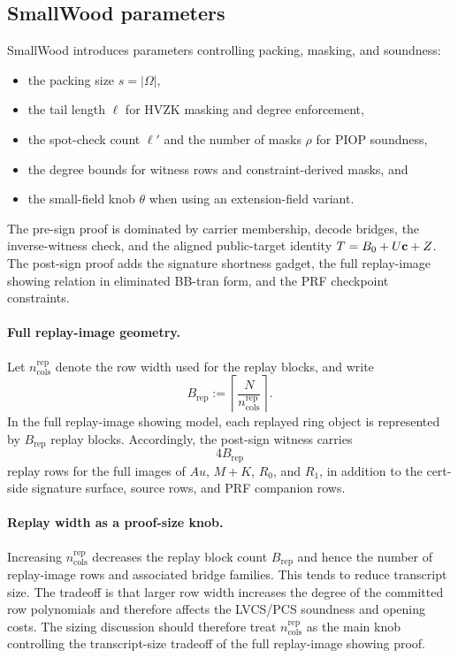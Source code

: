 \subsection{SmallWood parameters}
SmallWood introduces parameters controlling packing, masking, and soundness:
\begin{itemize}[leftmargin=1.25em]
  \item the packing size \(s=|\Omega|\),
  \item the tail length \(\ell\) for HVZK masking and degree enforcement,
  \item the spot-check count \(\ell'\) and the number of masks \(\rho\) for PIOP soundness,
  \item the degree bounds for witness rows and constraint-derived masks, and
  \item the small-field knob \(\theta\) when using an extension-field variant.
\end{itemize}
The pre-sign proof is dominated by carrier membership, decode bridges, the inverse-witness check, and the
aligned public-target identity \(T=B_0+U\mathbf{c}+Z\). The post-sign proof adds the signature shortness gadget, the full
replay-image showing relation in eliminated BB-tran form, and the PRF checkpoint constraints.

\paragraph{Full replay-image geometry.}
Let \(n_{\mathrm{cols}}^{\mathrm{rep}}\) denote the row width used for the replay blocks, and write
\[
B_{\mathrm{rep}} := \left\lceil \frac{N}{n_{\mathrm{cols}}^{\mathrm{rep}}} \right\rceil .
\]
In the full replay-image showing model, each replayed ring object is represented by \(B_{\mathrm{rep}}\) replay blocks.
Accordingly, the post-sign witness carries
\[
4B_{\mathrm{rep}}
\]
replay rows for the full images of \(Au\), \(M+K\), \(R_0\), and \(R_1\), in addition to the cert-side signature
surface, source rows, and PRF companion rows.

\paragraph{Replay width as a proof-size knob.}
Increasing \(n_{\mathrm{cols}}^{\mathrm{rep}}\) decreases the replay block count \(B_{\mathrm{rep}}\) and hence the number
of replay-image rows and associated bridge families. This tends to reduce transcript size. The tradeoff is that larger
row width increases the degree of the committed row polynomials and therefore affects the LVCS/PCS soundness and opening
costs. The sizing discussion should therefore treat \(n_{\mathrm{cols}}^{\mathrm{rep}}\) as the main knob controlling the
transcript-size tradeoff of the full replay-image showing proof.

